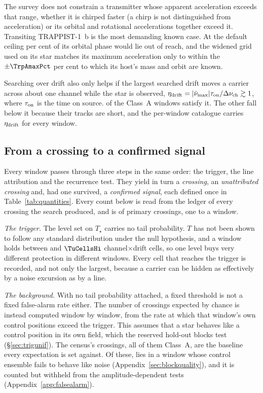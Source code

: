 The survey does not constrain a transmitter whose apparent
acceleration exceeds that range, whether it is chirped faster (a chirp is
not distinguished from acceleration) or its orbital and
rotational accelerations together exceed it. Transiting TRAPPIST-1~b is the
most demanding known case. At the default ceiling \TrapPhaseHi{} per cent of
its orbital phase would lie out of reach, and the widened grid used on its
star matches its maximum acceleration only to within the $\pm\TrpAmaxPct$ per
cent to which its host's mass and orbit are known.

Searching over drift also only helps if the largest searched drift moves a
carrier across about one channel while the star is observed,
$\eta_{\rm drift}=|\dot\nu_{\max}|\tau_{\rm on}/\Delta\nu_{\rm ch}\gtrsim1$,
where $\tau_{\rm on}$ is the time on source. \EtaDriftAOk{} of the \NWinA{}
Class~A windows satisfy it. The other \EtaDriftALo{} fall below it because
their tracks are short, and the per-window catalogue carries
$\eta_{\rm drift}$ for every window.

\subsection{From a crossing to a confirmed signal}
\label{sec:summary}

Every window passes through three steps in the same order: the trigger, the
line attribution and the recurrence test. They yield in turn a
\emph{crossing}, an \emph{unattributed crossing} and, had one survived, a
\emph{confirmed signal}, each defined once in Table~\ref{tab:quantities}.
Every count below is read from the ledger of every crossing the search
produced, and is of primary crossings, one to a window.

\emph{The trigger.} The level set on $T_\star$ carries no tail probability.
$T$ has not been shown to follow any standard distribution under the null
hypothesis, and a window holds between \TuCellsLo{} and $\TuCellsHi$
channel$\times$drift cells, so one level buys very different protection in
different windows. Every cell that reaches the trigger is recorded, and not
only the largest, because a carrier can be hidden as effectively by a noise
excursion as by a line.

\emph{The background.} With no tail probability attached, a fixed threshold
is not a fixed false-alarm rate either. The number of crossings expected by chance is instead computed window
by window, from the rate at which that window's own control positions exceed
the trigger. This assumes that a star behaves like a control position in its
own field, which the reserved hold-out blocks test (\S\ref{sec:trigunif}).
The census's \CsNCrossQp{} crossings, all of them Class~A, are the baseline
every expectation is set against. Of these, \BkFlagNCrossOther{} lies in a
window whose control ensemble fails to behave like noise
(Appendix~\ref{sec:blockquality}), and it is counted but withheld from the
amplitude-dependent tests (Appendix~\ref{app:falsealarm}).

